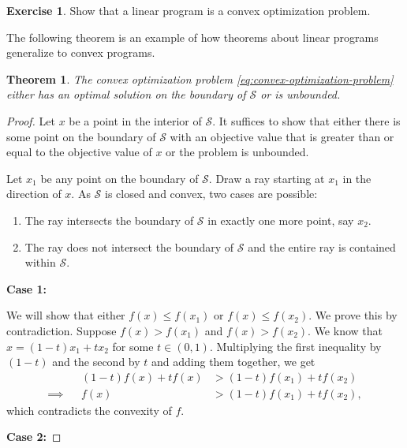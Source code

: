 \documentclass[
]{book}
\providecommand{\tightlist}{%
  \setlength{\itemsep}{0pt}\setlength{\parskip}{0pt}}
\newtheorem{theorem}{Theorem}[chapter]
\theoremstyle{definition}
\theoremstyle{definition}
\theoremstyle{definition}
\newtheorem{exercise}{Exercise}[chapter]
\theoremstyle{definition}
\theoremstyle{remark}
\begin{document}
\begin{exercise}
Show that a linear program is a convex optimization problem.
\end{exercise}

The following theorem is an example of how theorems about linear programs generalize to convex programs.

\begin{theorem}
\protect\hypertarget{thm:optimal-on-boundary}{}\label{thm:optimal-on-boundary}The convex optimization problem \eqref{eq:convex-optimization-problem} either has an optimal solution on the boundary of \(\mathcal{S}\) or is unbounded.
\end{theorem}

\begin{proof}
Let \({x}\) be a point in the interior of \(\mathcal{S}\).
It suffices to show that either there is some point on the boundary of \(\mathcal{S}\) with an objective value that is greater than or equal to the objective value of \({x}\) or the problem is unbounded.

Let \({x}_1\) be any point on the boundary of \(\mathcal{S}\). Draw a ray starting at \({x}_1\) in the direction of \({x}\).
As \(\mathcal{S}\) is closed and convex, two cases are possible:

\begin{enumerate}
\def\labelenumi{\arabic{enumi}.}
\tightlist
\item
  The ray intersects the boundary of \(\mathcal{S}\) in exactly one more point, say \({x}_2\).
\item
  The ray does not intersect the boundary of \(\mathcal{S}\) and the entire ray is contained within \(\mathcal{S}\).
\end{enumerate}

\textbf{Case 1:}

We will show that either \(f({x}) \le f({x}_1)\) or \(f({x}) \le f({x}_2)\).
We prove this by contradiction. Suppose \(f({x}) > f({x}_1)\) and \(f({x}) > f({x}_2)\).
We know that \(x = (1 - t) x_1 + t x_2\) for some \(t \in (0, 1)\).
Multiplying the first inequality by \((1-t)\) and the second by \(t\) and adding them together, we get
\begin{align*}
  && (1-t) f({x}) + t f({x}) &> (1-t) f({x}_1) + t f({x}_2) \\ 
  \implies 
  && f({x}) &> (1-t) f({x}_1) + t f({x}_2) ,
\end{align*}
which contradicts the convexity of \(f\).

\textbf{Case 2:}


\end{proof}
\end{document}
